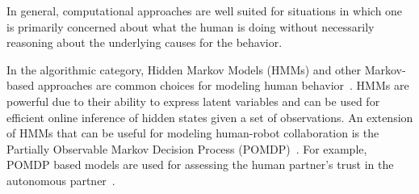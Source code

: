 \documentclass[12pt]{article}
\newcommand{\DGc}[1]{{\textbf{\color{blue}{#1}}}}
\begin{document}

In general, computational approaches are well suited for situations in which one is primarily concerned about what the human is doing without necessarily reasoning about the underlying causes for the behavior. 

In the algorithmic category, Hidden Markov Models (HMMs) and other Markov-based approaches are common choices for modeling human behavior~\cite{kelley2008understanding}. HMMs are powerful due to their ability to express latent variables and can be used for efficient online inference of hidden states given a set of observations. An extension of HMMs that can be useful for modeling human-robot collaboration is the Partially Observable Markov Decision Process (POMDP)~\cite{taha2011pomdp}. For example, POMDP based models are used for assessing the human partner's trust in the autonomous partner~\cite{chen2018planning}. 
\end{document}
